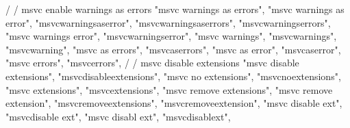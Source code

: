 {{{{{{        /
        / msvc enable warnings as errors
        "msvc warnings as errors", 
        "msvc warnings as error", 
        "msvcwarningsaserror", 
        "msvcwarningsaserrors", 
        "msvcwarningserrors", 
        "msvc warnings error", 
        "msvcwarningserror", 
        "msvc warnings", 
        "msvcwarnings", 
        "msvcwarning", 
        "msvc as errors", 
        "msvcaserrors", 
        "msvc as error", 
        "msvcaserror", 
        "msvc errors", 
        "msvcerrors", 
        /
        / msvc disable extensions 
        "msvc disable extensions", 
        "msvcdisableextensions", 
        "msvc no extensions", 
        "msvcnoextensions", 
        "msvc extensions", 
        "msvcextensions", 
        "msvc remove extensions", 
        "msvc remove extension", 
        "msvcremoveextensions", 
        "msvcremoveextension", 
        "msvc disable ext", 
        "msvcdisable ext", 
        "msvc disabl ext", 
        "msvcdisablext", 

}}}}}}
